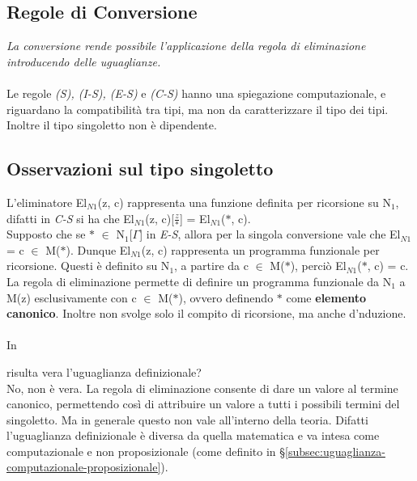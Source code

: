 \documentclass[10pt,a4paper, italian]{book}
\begin{document}
{{{\subsection{Regole di Conversione}
\label{subsec:conversione}
\begin{prooftree}
\end{prooftree}
\textit{La conversione rende possibile l'applicazione della regola di eliminazione introducendo delle uguaglianze.}
\\\\
Le regole \textit{(S), (I-S), (E-S)} e \textit{(C-S)}  hanno una spiegazione computazionale, e riguardano la compatibilit\`a tra tipi, ma non da caratterizzare il tipo dei tipi.\\ Inoltre il tipo singoletto non \`e dipendente.
\subsection{Osservazioni sul tipo singoletto}
\label{subsec:osservazioni}
L'eliminatore El$_{N1}$(z, c) rappresenta una funzione definita per ricorsione su N$_1$, difatti in \textit{C-S} si ha che El$_{N1}$(z, c)[$\frac{z}{\ast}$] = El$_{N1}$($\ast$, c).\\
Supposto che se $\ast$ $\in$ N$_1$[$\Gamma$] in \textit{E-S}, allora per la singola conversione vale che El$_{N1}$ = c $\in$ M($\ast$).
Dunque El$_{N1}$(z, c) rappresenta un programma funzionale per ricorsione. Questi \`e definito su N$_1$, a partire da c $\in$ M($\ast$), perci\`o El$_{N1}$($\ast$, c) = c.\\
La regola di eliminazione permette di definire un programma funzionale da N$_1$ a M(z) esclusivamente con c $\in$ M($\ast$), ovvero definendo $\ast$ come \textbf{elemento canonico}. Inoltre non svolge solo il compito di ricorsione, ma anche d'nduzione.
\\\\
In \begin{prooftree}
\end{prooftree}
risulta vera l'uguaglianza definizionale?\\
No, non \`e vera. La regola di eliminazione consente di dare un valore al termine canonico, permettendo cos\`i di attribuire un valore a tutti i possibili termini del singoletto. Ma in generale questo non vale all'interno della teoria. Difatti l'uguaglianza definizionale \`e diversa da quella matematica e va intesa come computazionale e non proposizionale (come definito in \S \ref{subsec:uguaglianza-computazionale-proposizionale}).

}}}
\end{document}
